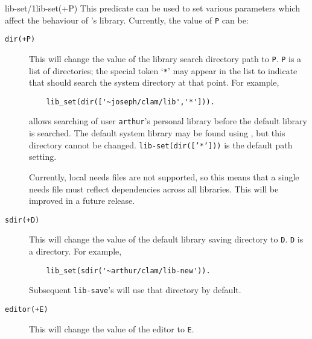 \begin{predicate}{lib-set/1}{lib-set(+P)}%
This predicate can be used to set various parameters which affect the
behaviour of {\clam}'s library. Currently, the value of {\tt P} can be:
\begin{description}
\item[{\tt dir(+P)}]
This will change the value of the library search directory
path  to
{\tt P}. {\tt P} is a list of directories; the special token
`\verb|*|' may appear in the list to indicate that \clam{} should
search the system directory at that point.  For
example,
\begin{verbatim}
    lib_set(dir(['~joseph/clam/lib','*'])).
\end{verbatim}
allows searching of user {\tt arthur}'s personal \clam{} library
before the default library is searched.  The default system
library
may be found using , but this directory cannot be
changed.  {\tt lib-set(dir(['*']))} is the default path setting.

Currently, local needs files are not supported, so this means that a
single needs file must reflect dependencies across all libraries.
This will be improved in a future release.

\item[{\tt sdir(+D)}]
This will change the value of the default library saving directory to
{\tt D}. {\tt D} is a directory.  For example,
\begin{verbatim}
    lib_set(sdir('~arthur/clam/lib-new')).
\end{verbatim}
Subsequent {\tt lib-save}'s will use that directory by default. 
  
\item[{\tt editor(+E)}]
This will change the value of the editor to {\tt E}.
\end{description}
\end{predicate}



